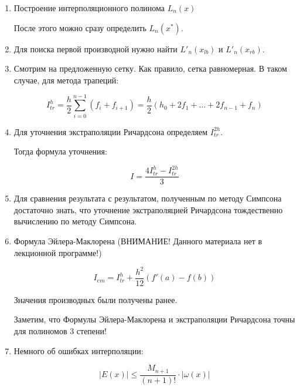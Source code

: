 \documentclass[10pt,a4paper]{article}
\begin{document}
	\begin{enumerate}
		\item Построение интерполяционного полинома $L_{n}\left(x\right)$
		
		После этого можно сразу определить $L_{n}\left(x^{*}\right)$.
		
		\item Для поиска первой производной нужно найти $L'_{n}\left(x_{lb}
		\right)$ и $L'_{n}\left(x_{rb}\right)$.
		
		\item Смотрим на предложенную сетку. Как правило, сетка равномерная. В
		таком случае, для метода трапеций:
		
		\begin{equation}
			I_{tr}^{h} = \frac{h}{2}\sum\limits_{i = 0}^{n - 1}\left(f_{i} + 
			f_{i + 
			1}\right) = \frac{h}{2}\left(h_{0} + 2f_{1} + \ldots + 2f_{n - 1} + 
			f_{n}\right)
		\end{equation}
		
		\item Для уточнения экстраполяции Ричардсона определяем $I_{tr}^{2h}$.
		
		Тогда формула уточнения:
		
		\begin{equation}
			I = \frac{4I^{h}_{tr} - I^{2h}_{tr}}{3}
		\end{equation}
		
		\item Для сравнения результата с результатом, полученным по методу 
		Симпсона достаточно знать, что уточнение экстраполяцией Ричардсона 
		тождественно вычислению по методу Симпсона.
		
		\item Формула Эйлера-Маклорена (ВНИМАНИЕ! Данного материала нет в 
		лекционной программе!)
		
		\begin{equation}
			I_{em} = I_{tr}^{h} + \frac{h^{2}}{12}\left(f'\left(a\right) - 
			f\left(b\right)\right)
		\end{equation}
		
		Значения производных были получены ранее.
		
		Заметим, что Формулы Эйлера-Маклорена и экстраполяции Ричардсона точны
		для полиномов 3 степени!
		
		\item Немного об ошибках интерполяции:
		
		\begin{equation}
			\left|E\left(x\right)\right| \leqslant \frac{M_{n + 1}}{\left(n + 1
			\right)!}\cdot\left|\omega\left(x\right)\right|
		\end{equation}
		

\end{enumerate}
\end{document}

